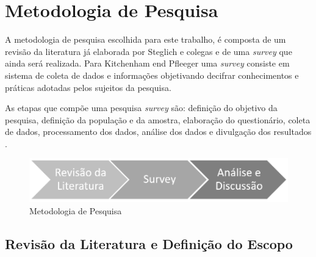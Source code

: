 \chapter{\label{chap:intro}Metodologia de Pesquisa}

A metodologia de pesquisa escolhida para este trabalho, é composta de um revisão da literatura já elaborada por Steglich e colegas \cite{caio2019} e de uma \textit{survey} que ainda será realizada. Para Kitchenham end Pfleeger \cite{pfleeger2001principles} uma \textit{survey} consiste em sistema de coleta de dados e informações objetivando decifrar conhecimentos e práticas adotadas pelos sujeitos da pesquisa.
   
As etapas que compõe uma pesquisa \textit{survey} são:  definição do objetivo da pesquisa, definição da população e da amostra, elaboração do questionário, coleta de dados, processamento dos dados, análise dos dados e divulgação dos resultados \cite{vieira2010dicionario}.

\begin{figure}
    \centering
    \includegraphics[scale=0.66]{fig/metodologia.PNG}
    \caption{Metodologia de Pesquisa}
    \label{fig:my_label}
\end{figure}


\section{\textbf{Revisão da Literatura e Definição do Escopo}}


